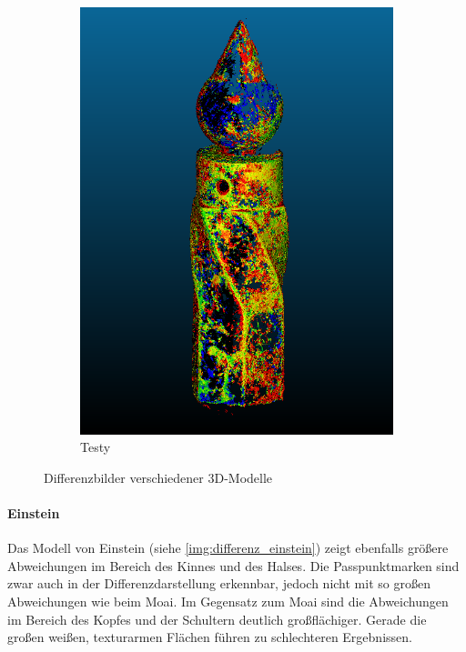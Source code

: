 \documentclass[./00PhotoBox.tex]{subfiles}
\begin{document}
\begin{figure}[htbp]
\begin{subfigure}{0.27\textwidth}
        \includegraphics[width=1\textwidth]{img/7_versuche/testy_diff.png}
        \caption{Testy}
        \label{img:differenz_testy}
    \end{subfigure}
    \caption{Differenzbilder verschiedener 3D-Modelle}
    \label{img:differenz}
\end{figure}

\paragraph{Einstein}
Das Modell von Einstein (siehe \autoref{img:differenz_einstein}) zeigt ebenfalls größere Abweichungen im Bereich des Kinnes und des Halses. Die Passpunktmarken sind zwar auch in der Differenzdarstellung erkennbar, jedoch nicht mit so großen Abweichungen wie beim Moai. Im Gegensatz zum Moai sind die Abweichungen im Bereich des Kopfes und der Schultern deutlich großflächiger. Gerade die großen weißen, texturarmen Flächen führen zu schlechteren Ergebnissen.
\end{document}

